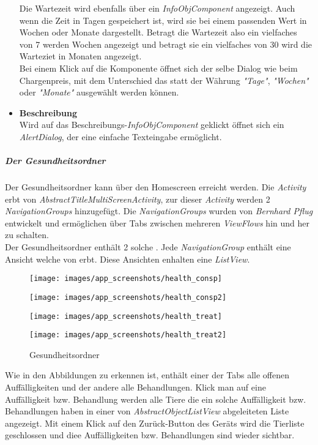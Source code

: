 \begin{itemize}
Die Wartezeit wird ebenfalls über ein \textit{InfoObjComponent} angezeigt. Auch wenn die Zeit in Tagen gespeichert ist, wird sie bei einem passenden Wert in Wochen oder Monate dargestellt. Betragt die Wartezeit also ein vielfaches von 7 werden Wochen angezeigt und betragt sie ein vielfaches von 30 wird die Warteziet in Monaten angezeigt. \\
Bei einem Klick auf die Komponente öffnet sich der selbe Dialog wie beim Chargenpreis, mit dem Unterschied das statt der Währung \textit{"Tage"}, \textit{"Wochen"} oder \textit{"Monate"} ausgewählt werden können.
\item{\textbf{Beschreibung}} \\
Wird auf das Beschreibungs-\textit{InfoObjComponent} geklickt öffnet sich ein \textit{AlertDialog}, der eine einfache Texteingabe ermöglicht.
\end{itemize}
\subparagraph{Der Gesundheitsordner}
Der Gesundheitsordner kann über den Homescreen erreicht werden. Die \textit{Activity} erbt von \textit{AbstractTitleMultiScreenActivity}, zur dieser \textit{Activity} werden 2 \textit{NavigationGroups} hinzugefügt. Die \textit{NavigationGroups} wurden von \textit{Bernhard Pflug} entwickelt und ermöglichen über Tabs zwischen mehreren \textit{ViewFlows} hin und her zu schalten. \\
Der Gesundheitsordner enthält 2 solche . Jede \textit{NavigationGroup} enthält eine Ansicht welche von  erbt. Diese Ansichten enhalten eine \textit{ListView}. 
\begin{figure}[H]
  \centering
  \begin{minipage}[t]{3.6 cm}
  	\centering
  	\texttt{[image: images/app\_screenshots/health\_consp]} 
  \end{minipage}
  \begin{minipage}[t]{3.6 cm}
	\centering
	\texttt{[image: images/app\_screenshots/health\_consp2]}  
  \end{minipage}
  \begin{minipage}[t]{3.6 cm}
  	\centering
  	\texttt{[image: images/app\_screenshots/health\_treat]} 
  \end{minipage}
  \begin{minipage}[t]{3.6 cm}
	\centering
	\texttt{[image: images/app\_screenshots/health\_treat2]}  
  \end{minipage}
  \caption{Gesundheitsordner}
\end{figure}
Wie in den Abbildungen zu erkennen ist, enthält einer der Tabs alle offenen Auffälligkeiten und der andere alle Behandlungen. Klick man auf eine Auffälligkeit bzw. Behandlung werden alle Tiere die ein solche Auffälligkeit bzw. Behandlungen haben in einer von \textit{AbstractObjectListView} abgeleiteten Liste angezeigt. Mit einem Klick auf den Zurück-Button des Geräts wird die Tierliste geschlossen und diee Auffälligkeiten bzw. Behandlungen sind wieder sichtbar. 